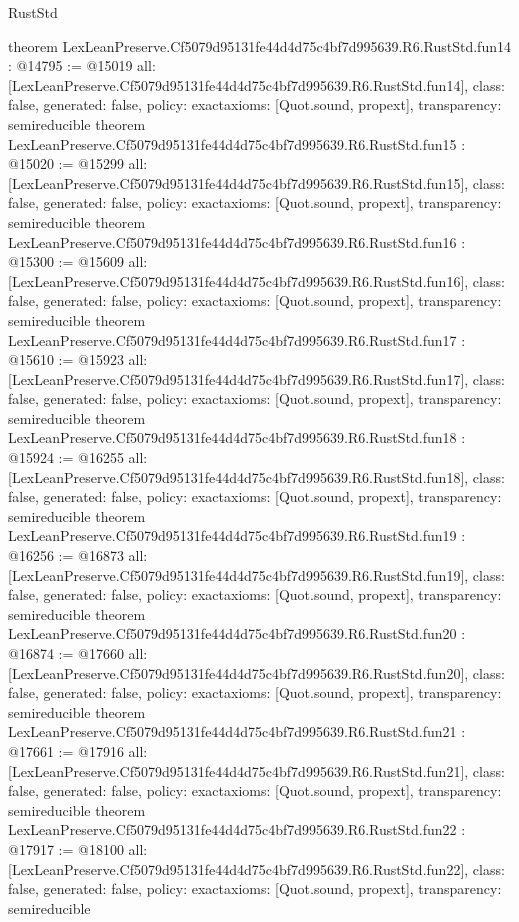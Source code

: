 \begin{lexlean}{RustStd}
\begin{coremodule}
{}
theorem LexLeanPreserve.Cf5079d95131fe44d4d75c4bf7d995639.R6.RustStd.fun14 : @14795 := @15019 {
  all: [LexLeanPreserve.Cf5079d95131fe44d4d75c4bf7d995639.R6.RustStd.fun14],
  class: false,
  generated: false,
  policy: exact{axioms: [Quot.sound, propext]},
  transparency: semireducible
}
theorem LexLeanPreserve.Cf5079d95131fe44d4d75c4bf7d995639.R6.RustStd.fun15 : @15020 := @15299 {
  all: [LexLeanPreserve.Cf5079d95131fe44d4d75c4bf7d995639.R6.RustStd.fun15],
  class: false,
  generated: false,
  policy: exact{axioms: [Quot.sound, propext]},
  transparency: semireducible
}
theorem LexLeanPreserve.Cf5079d95131fe44d4d75c4bf7d995639.R6.RustStd.fun16 : @15300 := @15609 {
  all: [LexLeanPreserve.Cf5079d95131fe44d4d75c4bf7d995639.R6.RustStd.fun16],
  class: false,
  generated: false,
  policy: exact{axioms: [Quot.sound, propext]},
  transparency: semireducible
}
theorem LexLeanPreserve.Cf5079d95131fe44d4d75c4bf7d995639.R6.RustStd.fun17 : @15610 := @15923 {
  all: [LexLeanPreserve.Cf5079d95131fe44d4d75c4bf7d995639.R6.RustStd.fun17],
  class: false,
  generated: false,
  policy: exact{axioms: [Quot.sound, propext]},
  transparency: semireducible
}
theorem LexLeanPreserve.Cf5079d95131fe44d4d75c4bf7d995639.R6.RustStd.fun18 : @15924 := @16255 {
  all: [LexLeanPreserve.Cf5079d95131fe44d4d75c4bf7d995639.R6.RustStd.fun18],
  class: false,
  generated: false,
  policy: exact{axioms: [Quot.sound, propext]},
  transparency: semireducible
}
theorem LexLeanPreserve.Cf5079d95131fe44d4d75c4bf7d995639.R6.RustStd.fun19 : @16256 := @16873 {
  all: [LexLeanPreserve.Cf5079d95131fe44d4d75c4bf7d995639.R6.RustStd.fun19],
  class: false,
  generated: false,
  policy: exact{axioms: [Quot.sound, propext]},
  transparency: semireducible
}
theorem LexLeanPreserve.Cf5079d95131fe44d4d75c4bf7d995639.R6.RustStd.fun20 : @16874 := @17660 {
  all: [LexLeanPreserve.Cf5079d95131fe44d4d75c4bf7d995639.R6.RustStd.fun20],
  class: false,
  generated: false,
  policy: exact{axioms: [Quot.sound, propext]},
  transparency: semireducible
}
theorem LexLeanPreserve.Cf5079d95131fe44d4d75c4bf7d995639.R6.RustStd.fun21 : @17661 := @17916 {
  all: [LexLeanPreserve.Cf5079d95131fe44d4d75c4bf7d995639.R6.RustStd.fun21],
  class: false,
  generated: false,
  policy: exact{axioms: [Quot.sound, propext]},
  transparency: semireducible
}
theorem LexLeanPreserve.Cf5079d95131fe44d4d75c4bf7d995639.R6.RustStd.fun22 : @17917 := @18100 {
  all: [LexLeanPreserve.Cf5079d95131fe44d4d75c4bf7d995639.R6.RustStd.fun22],
  class: false,
  generated: false,
  policy: exact{axioms: [Quot.sound, propext]},
  transparency: semireducible
}
\end{coremodule}
\end{lexlean}
